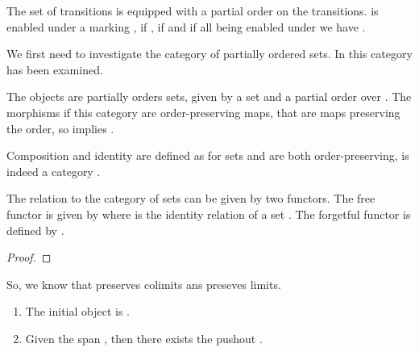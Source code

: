 The set of transitions  is equipped with a partial order  on the transitions.  is enabled under a marking , if , if  and if 
 all  being enabled under  we have .

We first need to investigate the category \cPosets of partially ordered sets. In \cite{Cod07} this category has been examined.

\begin{definition}
   The objects are partially orders sets, given by a set  and a partial order  over .
	 The morphisms if this category are order-preserving maps, that are maps   preserving the order, so  implies .
\end{definition}
Composition  and identity are defined as for sets and are both order-preserving,  \cPosets is indeed a category \cite{Cod07}.

The relation to the category of sets can be given by two functors.
The free functor   is given by  where  is the identity relation of a set .
The forgetful functor  is defined by .

\begin{lemma}

\end{lemma}

\begin{proof}
\end{proof}
So, we know that  preserves  colimits ans  preseves limits.


\begin{lemma}
\label{l.poPosets}
\begin{enumerate}
	\item The initial object is .
	\item Given the span , then there exists  the pushout
	     .
\end{enumerate}
\end{lemma}

